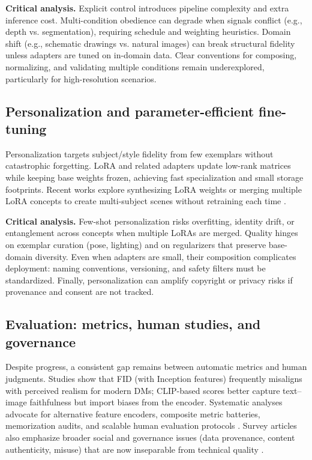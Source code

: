 \documentclass[conference]{IEEEtran}
\begin{document}
\textbf{Critical analysis.} Explicit control introduces pipeline complexity and extra inference cost. Multi-condition obedience can degrade when signals conflict (e.g., depth vs. segmentation), requiring schedule and weighting heuristics. Domain shift (e.g., schematic drawings vs. natural images) can break structural fidelity unless adapters are tuned on in-domain data. Clear conventions for composing, normalizing, and validating multiple conditions remain underexplored, particularly for high-resolution scenarios.

\subsection{Personalization and parameter-efficient fine-tuning}
Personalization targets subject/style fidelity from few exemplars without catastrophic forgetting. LoRA and related adapters update low-rank matrices while keeping base weights frozen, achieving fast specialization and small storage footprints. Recent works explore synthesizing LoRA weights or merging multiple LoRA concepts to create multi-subject scenes without retraining each time \cite{Smith2024LoRADiffusion,Simsar2025LoRACLR}. 

\textbf{Critical analysis.} Few-shot personalization risks overfitting, identity drift, or entanglement across concepts when multiple LoRAs are merged. Quality hinges on exemplar curation (pose, lighting) and on regularizers that preserve base-domain diversity. Even when adapters are small, their composition complicates deployment: naming conventions, versioning, and safety filters must be standardized. Finally, personalization can amplify copyright or privacy risks if provenance and consent are not tracked.

\subsection{Evaluation: metrics, human studies, and governance}
Despite progress, a consistent gap remains between automatic metrics and human judgments. Studies show that FID (with Inception features) frequently misaligns with perceived realism for modern DMs; CLIP-based scores better capture text--image faithfulness but import biases from the encoder. Systematic analyses advocate for alternative feature encoders, composite metric batteries, memorization audits, and scalable human evaluation protocols \cite{Stein2023EvaluationFlaws}. Survey articles also emphasize broader social and governance issues (data provenance, content authenticity, misuse) that are now inseparable from technical quality \cite{Chen2025ComprehensiveSurvey}. 
\end{document}
